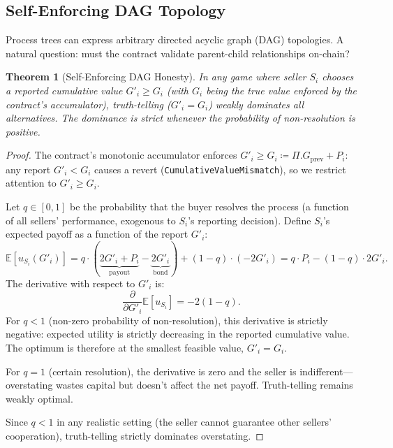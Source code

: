 \documentclass[11pt,a4paper]{article}
\newtheorem{theorem}{Theorem}[section]
\theoremstyle{definition}
\theoremstyle{remark}
\newcommand{\pay}{P}           %
\newcommand{\cumval}{G}        %
\begin{document}
\subsection{Self-Enforcing DAG Topology}

Process trees can express arbitrary directed acyclic graph (DAG)
topologies. A natural question: must the contract validate parent-child
relationships on-chain?

\begin{theorem}[Self-Enforcing DAG Honesty]
\label{thm:self-enforcing-dag}
In any game where seller $S_i$ chooses a reported cumulative value
$\cumval'_i \geq \cumval_i$ (with $\cumval_i$ being the true
value enforced by the contract's accumulator), truth-telling
($\cumval'_i = \cumval_i$) weakly dominates all alternatives.
The dominance is strict whenever the probability of non-resolution
is positive.
\end{theorem}

\begin{proof}
The contract's monotonic accumulator enforces
$\cumval'_i \geq \cumval_i \coloneqq \Pi.\cumval_{\text{prev}} + \pay_i$:
any report $\cumval'_i < \cumval_i$ causes a revert
(\texttt{CumulativeValueMismatch}), so we restrict attention to
$\cumval'_i \geq \cumval_i$.

Let $q \in [0, 1]$ be the probability that the buyer resolves the
process (a function of all sellers' performance, exogenous to $S_i$'s
reporting decision). Define $S_i$'s expected payoff as a function of
the report $\cumval'_i$:
\begin{equation}
  \mathbb{E}[u_{S_i}(\cumval'_i)]
    = q \cdot (\underbrace{2\cumval'_i + \pay_i}_{\text{payout}}
             - \underbrace{2\cumval'_i}_{\text{bond}})
    + (1 - q) \cdot (-2\cumval'_i)
    = q \cdot \pay_i - (1 - q) \cdot 2\cumval'_i.
  \label{eq:dag-expected-utility}
\end{equation}
The derivative with respect to $\cumval'_i$ is:
\begin{equation}
  \frac{\partial}{\partial \cumval'_i}
    \mathbb{E}[u_{S_i}] = -2(1 - q).
  \label{eq:dag-derivative}
\end{equation}
For $q < 1$ (non-zero probability of non-resolution), this derivative
is strictly negative: expected utility is strictly decreasing in the
reported cumulative value. The optimum is therefore at the smallest
feasible value, $\cumval'_i = \cumval_i$.

For $q = 1$ (certain resolution), the derivative is zero and the seller
is indifferent---overstating wastes capital but doesn't affect the net
payoff. Truth-telling remains weakly optimal.

Since $q < 1$ in any realistic setting (the seller cannot guarantee
other sellers' cooperation), truth-telling strictly dominates
overstating.
\end{proof}
\end{document}
